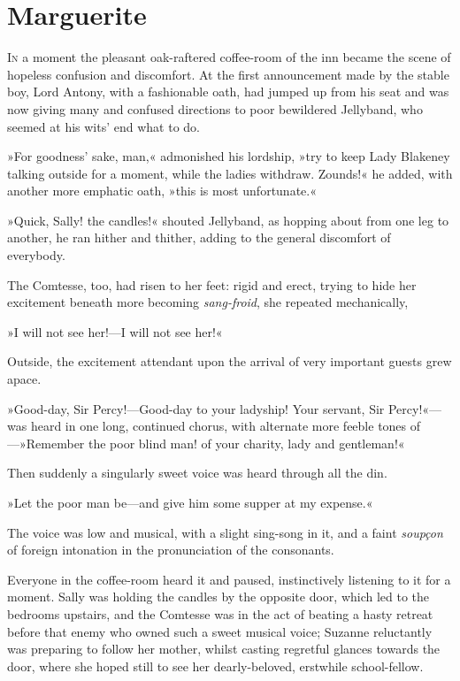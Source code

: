 
\chapter{Marguerite}
\lettrine[lines=4]{I}{n} a moment the pleasant oak-raftered coffee-room of the inn became the scene of hopeless confusion and discomfort. At the first announcement made by the stable boy, Lord Antony, with a fashionable oath, had jumped up from his seat and was now giving many and confused directions to poor bewildered Jellyband, who seemed at his wits' end what to do.

»For goodness' sake, man,« admonished his lordship, »try to keep Lady Blakeney talking outside for a moment, while the ladies withdraw. Zounds!« he added, with another more emphatic oath, »this is most unfortunate.«

»Quick, Sally! the candles!« shouted Jellyband, as hopping about from one leg to another, he ran hither and thither, adding to the general discomfort of everybody.

The Comtesse, too, had risen to her feet: rigid and erect, trying to hide her excitement beneath more becoming \textit{sang-froid}, she repeated mechanically,\longdash


»I will not see her!\allowbreak---\allowbreak I will not see her!«

Outside, the excitement attendant upon the arrival of very important guests grew apace.

»Good-day, Sir Percy!\allowbreak---\allowbreak Good-day to your ladyship! Your servant, Sir Percy!«\allowbreak---\allowbreak was heard in one long, continued chorus, with alternate more feeble tones of\allowbreak---\allowbreak »Remember the poor blind man! of your charity, lady and gentleman!«

Then suddenly a singularly sweet voice was heard through all the din.

»Let the poor man be\allowbreak---\allowbreak and give him some supper at my expense.«

The voice was low and musical, with a slight sing-song in it, and a faint \textit{soupçon} of foreign intonation in the pronunciation of the consonants.

Everyone in the coffee-room heard it and paused, instinctively listening to it for a moment. Sally was holding the candles by the opposite door, which led to the bedrooms upstairs, and the Comtesse was in the act of beating a hasty retreat before that enemy who owned such a sweet musical voice; Suzanne reluctantly was preparing to follow her mother, whilst casting regretful glances towards the door, where she hoped still to see her dearly-beloved, erstwhile school-fellow.

